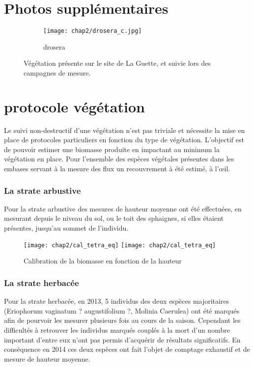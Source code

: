 
\section{Photos supplémentaires}
\label{sec:photos_veg}


\begin{figure}[htbp]
    \centering
    \begin{subfigure}[b]{.8\textwidth}
        \centering \texttt{[image: chap2/drosera\_c.jpg]}
        \caption{drosera}\label{fig:dro}
    \end{subfigure}
    \caption{Végétation présente sur le site de La Guette, et suivie lors des campagnes de mesure.}\label{fig:veg_other}
\end{figure}

\section{protocole végétation}
\label{sec:protocole_veg}


Le suivi non-destructif d'une végétation n'est pas triviale et nécessite la mise en place de protocoles particuliers en fonction du type de végétation.
L'objectif est de pouvoir estimer une biomasse produite en impactant au minimum la végétation en place.
Pour l'ensemble des espèces végétales présentes dans les embases servant à la mesure des flux un recouvrement à été estimé, à l’œil.


\subsubsection{La strate arbustive}
Pour la strate arbustive des mesures de hauteur moyenne ont été effectuées, en mesurant depuis le niveau du sol, ou le toit des sphaignes, si elles étaient présentes, jusqu'au sommet de l'individu.
\begin{figure}
\texttt{[image: chap2/cal\_tetra\_eq]}
\texttt{[image: chap2/cal\_tetra\_eq]}
\caption{Calibration de la biomasse en fonction de la hauteur}
\label{fig:cal_arbu}
\end{figure}

\subsubsection{La strate herbacée}
Pour la strate herbacée, en 2013, 5 individus des deux espèces majoritaires (Eriophorum vaginatum ? augustifolium ?, Molinia Caerulea) ont été marqués afin de pourvoir les mesurer plusieurs fois au cours de la saison.
Cependant les difficultés à retrouver les individus marqués couplés à la mort d'un nombre important d'entre eux n'ont pas permis d'acquérir de résultats significatifs.
En conséquence en 2014 ces deux espèces ont fait l'objet de comptage exhaustif et de mesure de hauteur moyenne.


